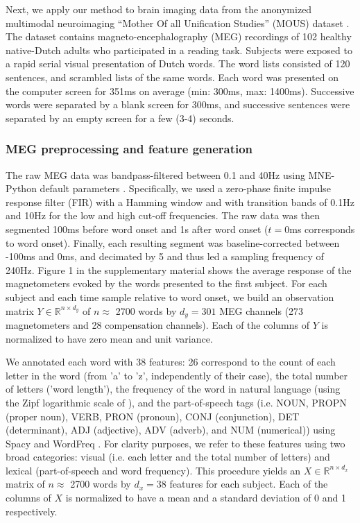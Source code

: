 
Next, we apply our method to brain imaging data from the anonymized multimodal
neuroimaging ``Mother Of all Unification Studies'' (MOUS) dataset
\citep{schoffelen2019204}. The dataset contains magneto-encephalography (MEG)
recordings of 102 healthy native-Dutch adults who participated in a reading
task.
%
Subjects were exposed to a rapid serial visual presentation of Dutch words. The
word lists consisted of 120 sentences, and scrambled lists of the same words.
Each word was presented on the computer screen for 351ms on average (min: 300ms,
max: 1400ms). Successive words were separated by a blank screen for 300ms, and
successive sentences were separated by an empty screen for a few (3-4) seconds.

\subsubsection{MEG preprocessing and feature generation}

The raw MEG data was bandpass-filtered between 0.1 and 40Hz using MNE-Python
default parameters \citep{gramfort2013meg, gramfort2014mne}. Specifically, we used a zero-phase finite impulse
response filter (FIR) with a Hamming window and with transition bands of 0.1Hz
and 10Hz for the low and high cut-off frequencies. The raw data was then segmented 100ms before word onset and 1s after
word onset ($t=0$ms corresponds to word onset). Finally, each resulting
segment was baseline-corrected between -100ms and 0ms, and decimated by 5 and
thus led a sampling frequency of 240Hz. Figure 1 in the supplementary material
shows the average response of the magnetometers evoked by the words presented
to the first subject. For each subject and each time sample relative to word onset, we
build an observation matrix $Y \in \mathbb{R}^{n \times d_y}$ of $n\approx$ 2700 words
by $d_y=301$ MEG channels (273 magnetometers and 28 compensation channels). Each
of the columns of $Y$ is normalized to have zero mean and unit variance.

We annotated each word with 38 features: 26
correspond to the count of each letter in the word (from 'a' to 'z',
independently of their case), the total number of letters ('word length'), the
frequency of the word in natural language (using the Zipf logarithmic scale
of \citep{van2014subtlex}), and the part-of-speech tags (i.e. NOUN, PROPN (proper
noun), VERB, PRON (pronoun), CONJ (conjunction), DET (determinant), ADJ
(adjective), ADV (adverb), and NUM (numerical)) using Spacy \citep{spacy2} and
WordFreq \citep{speerwordfreq}. For clarity purposes, we refer to these
features using two broad categories: visual (i.e. each letter and the total
number of letters) and lexical (part-of-speech and word frequency). This
procedure yields an $X \in \mathbb{R}^{n \times d_x}$ matrix of $n\approx$ 2700 words by
$d_x=38$ features for each subject. Each of the columns of $X$ is normalized to
have a mean and a standard deviation of 0 and 1 respectively.

